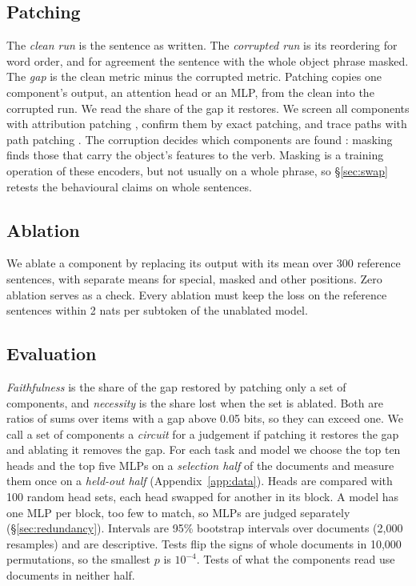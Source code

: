 \documentclass[11pt]{article}
\begin{document}
\subsection{Patching}
The \emph{clean run} is the sentence as written.
The \emph{corrupted run} is its reordering for word order, and for agreement the sentence with the whole object phrase masked.
The \emph{gap} is the clean metric minus the corrupted metric.
Patching copies one component's output, an attention head or an MLP, from the clean into the corrupted run.
We read the share of the gap it restores.
We screen all components with attribution patching \citep{syed2024}, confirm them by exact patching, and trace paths with path patching \citep{wang2023}.
The corruption decides which components are found \citep{zhang2024}: masking finds those that carry the object's features to the verb.
Masking is a training operation of these encoders, but not usually on a whole phrase, so \S\ref{sec:swap} retests the behavioural claims on whole sentences.

\subsection{Ablation}
We ablate a component by replacing its output with its mean over 300 reference sentences, with separate means for special, masked and other positions.
Zero ablation serves as a check.
Every ablation must keep the loss on the reference sentences within 2 nats per subtoken of the unablated model.

\subsection{Evaluation}
\emph{Faithfulness} is the share of the gap restored by patching only a set of components, and \emph{necessity} is the share lost when the set is ablated.
Both are ratios of sums over items with a gap above 0.05 bits, so they can exceed one.
We call a set of components a \emph{circuit} for a judgement if patching it restores the gap and ablating it removes the gap.
For each task and model we choose the top ten heads and the top five MLPs on a \emph{selection half} of the documents and measure them once on a \emph{held-out half} (Appendix~\ref{app:data}).
Heads are compared with 100 random head sets, each head swapped for another in its block.
A model has one MLP per block, too few to match, so MLPs are judged separately (\S\ref{sec:redundancy}).
Intervals are 95\% bootstrap intervals over documents (2,000 resamples) and are descriptive.
Tests flip the signs of whole documents in 10,000 permutations, so the smallest $p$ is $10^{-4}$.
Tests of what the components read use documents in neither half.
\end{document}
